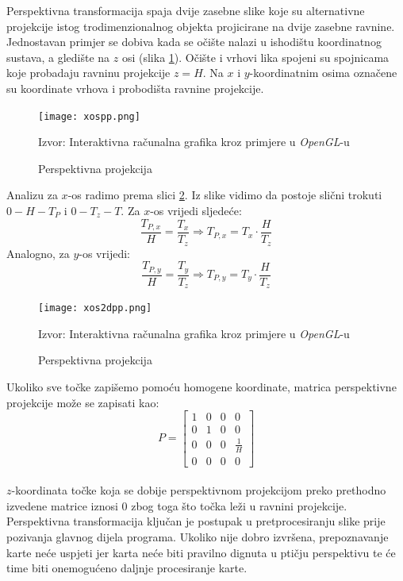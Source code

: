 \documentclass[times, zavrsni, numeric, utf8]{fer}
\newcommand{\source}[1]{\caption*{Izvor: {#1}} }
\begin{document}
Perspektivna transformacija\cite{oreillycv} spaja dvije zasebne slike koje su alternativne projekcije istog trodimenzionalnog objekta projicirane na dvije zasebne ravnine. Jednostavan primjer se dobiva kada se očište nalazi u ishodištu koordinatnog sustava, a gledište na $z$ osi (slika \ref{fig:exampleperspective}). Očište i vrhovi lika spojeni su spojnicama koje probadaju ravninu projekcije $z = H$. Na $x$ i $y$-koordinatnim osima označene su koordinate vrhova i probodišta ravnine projekcije.
\begin{figure}[H]
\centering
\texttt{[image: xospp.png]}
\caption{Perspektivna projekcija}
\label{fig:exampleperspective}
\source{Interaktivna računalna grafika kroz primjere u \textit{OpenGL}-u\cite{cupicmihajlovic}}
\end{figure}
Analizu za $x$-os radimo prema slici \ref{fig:perpanaliza}. Iz slike vidimo da postoje slični trokuti $0 - H - T_P$ i $0 - T_z - T$. Za $x$-os vrijedi sljedeće:
\begin{equation}
\frac{T_{P,x}}{H} = \frac{T_x}{T_z} \Rightarrow T_{P, x} = {T_x}\cdot\frac{H}{T_z}
\end{equation}
Analogno, za $y$-os vrijedi:
\begin{equation}
\frac{T_{P,y}}{H} = \frac{T_y}{T_z} \Rightarrow T_{P, y} = {T_y}\cdot\frac{H}{T_z}
\end{equation}
\begin{figure}[H]
\centering
\texttt{[image: xos2dpp.png]}
\caption{Perspektivna projekcija}
\label{fig:perpanaliza}
\source{Interaktivna računalna grafika kroz primjere u \textit{OpenGL}-u\cite{cupicmihajlovic}}
\end{figure}
Ukoliko sve točke zapišemo pomoću homogene koordinate, matrica perspektivne projekcije može se zapisati kao:
\begin{equation}
				P =
				\begin{bmatrix}
					1 & 0 & 0 & 0\\
					0 & 1 & 0 & 0\\
					0 & 0 & 0 & \frac{1}{H}\\
					0 & 0 & 0 & 0
				\end{bmatrix}
\end{equation}
\\
$z$-koordinata točke koja se dobije perspektivnom projekcijom preko prethodno izvedene matrice iznosi 0 zbog toga što točka leži u ravnini projekcije. \\
Perspektivna transformacija ključan je postupak u pretprocesiranju slike prije pozivanja glavnog dijela programa. Ukoliko nije dobro izvršena, prepoznavanje karte neće uspjeti jer karta neće biti pravilno dignuta u ptičju perspektivu te će time biti onemogućeno daljnje procesiranje karte.
\end{document}
